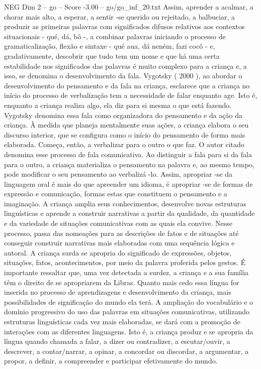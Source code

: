 \begin{textsample}{NEG Dim 2 – go – Score -3.00 – go/go\_inf\_20.txt}
Assim, aprender a acalmar, a chorar mais alto, a esperar, a sentir -se querido ou rejeitado, a balbuciar, a produzir as primeiras palavras com significados difusos relativos aos contextos situacionais - qué, dá, bô -, a combinar palavras iniciando o processo de gramaticalização, flexão e sintaxe - qué aua, dá neném, fazi cocô - e, gradativamente, descobrir que tudo tem um nome e que há uma certa estabilidade nos significados das palavras é muito complexo para a criança e, a isso, se denomina o desenvolvimento da fala.
Vygotsky ( 2000 ), ao abordar o desenvolvimento do pensamento e da fala na criança, esclarece que a criança no início do processo de verbalização tem a necessidade de falar enquanto age.
Isto é, enquanto a criança realiza algo, ela diz para si mesma o que está fazendo.
Vygotsky denomina essa fala como organizadora do pensamento e da ação da criança.
À medida que planeja mentalmente suas ações, a criança elabora o seu discurso interior, que se configura como o início do pensamento de forma mais elaborada.
Começa, então, a verbalizar para o outro o que faz.
O autor citado denomina esse processo de fala comunicativa.
Ao distinguir a fala para si da fala para o outro, a criança materializa o pensamento na palavra e, ao mesmo tempo, pode modificar o seu pensamento ao verbalizá -lo.
Assim, apropriar -se da linguagem oral é mais do que apreender um idioma, é apropriar -se de formas de expressão e comunicação, formas estas que constituem o pensamento e a imaginação.
A criança amplia seus conhecimentos, desenvolve novas estruturas linguísticas e aprende a construir narrativas a partir da qualidade, da quantidade e da variedade de situações comunicativas com as quais ela convive.
Nesse processo, passa das nomeações para as descrições de fatos e de situações até conseguir construir narrativas mais elaboradas com uma sequência lógica e autoral.
A criança surda se apropria do significado de expressões, objetos, situações, fatos, acontecimentos, por meio da palavra proferida pelos gestos.
É importante ressaltar que, uma vez detectada a surdez, a criança e a sua família têm o direito de se apropriarem da Libras.
Quanto mais cedo essa língua for inserida no processo de aprendizagens e desenvolvimento da criança, mais possibilidades de significação do mundo ela terá.
A ampliação do vocabulário e o domínio progressivo do uso das palavras em situações comunicativas, utilizando estruturas linguísticas cada vez mais elaboradas, se dará com a promoção de interações com as diferentes linguagens.
Isto é, a criança produz e se apropria da língua quando chamada a falar, a dizer ou contradizer, a escutar/ouvir, a descrever, a contar/narrar, a opinar, a concordar ou discordar, a argumentar, a propor, a definir, a compreender e participar efetivamente do mundo.

\end{textsample}
